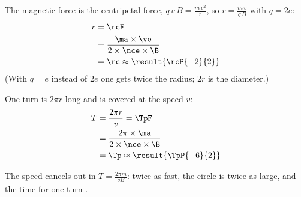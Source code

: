 \begin{abcliste}
\abc The magnetic force is the centripetal force, $q\,v\,B = \frac{m\,v^2}{r}$, so $r = \frac{m\,v}{q\,B}$ with $q = 2e$:
\begin{align}
 r &= \rcF \\
   &= \frac{\ma\times\ve}{2\times\nce\times\B} \\
   &= \rc \approx \result{\rcP{-2}{2}}
\end{align}
(With $q = e$ instead of $2e$ one gets twice the radius; $2r$ is the diameter.)

\abc One turn is $2\pi r$ long and is covered at the speed $v$:
\begin{align}
 T &= \frac{2\pi r}{v} = \TpF \\
   &= \frac{2\pi\times\ma}{2\times\nce\times\B} \\
   &= \Tp \approx \result{\TpP{-6}{2}}
\end{align}

\abc The speed cancels out in $T = \frac{2\pi m}{q B}$: twice as fast, the circle is twice as large, and the time for one turn .
\end{abcliste}
